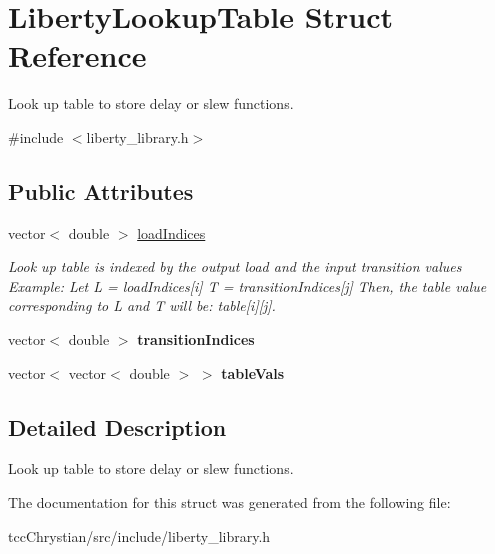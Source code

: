 \hypertarget{structLibertyLookupTable}{\section{Liberty\-Lookup\-Table Struct Reference}
\label{structLibertyLookupTable}
}


Look up table to store delay or slew functions.  




{\ttfamily \#include $<$liberty\-\_\-library.\-h$>$}

\subsection*{Public Attributes}
\begin{DoxyCompactItemize}
\item 
\hypertarget{structLibertyLookupTable_aa9185452db835be3f9c603c3f3df5562}{vector$<$ double $>$ \hyperlink{structLibertyLookupTable_aa9185452db835be3f9c603c3f3df5562}{load\-Indices}}\label{structLibertyLookupTable_aa9185452db835be3f9c603c3f3df5562}

\begin{DoxyCompactList}\small\item\em Look up table is indexed by the output load and the input transition values Example\-: Let L = load\-Indices\mbox{[}i\mbox{]} T = transition\-Indices\mbox{[}j\mbox{]} Then, the table value corresponding to L and T will be\-: table\mbox{[}i\mbox{]}\mbox{[}j\mbox{]}. \end{DoxyCompactList}\item 
\hypertarget{structLibertyLookupTable_a1f7a1d2e84535f8c7df9bac33732634d}{vector$<$ double $>$ {\bfseries transition\-Indices}}\label{structLibertyLookupTable_a1f7a1d2e84535f8c7df9bac33732634d}

\item 
\hypertarget{structLibertyLookupTable_a1ca823f563ac9e3e8a616b09a19da596}{vector$<$ vector$<$ double $>$ $>$ {\bfseries table\-Vals}}\label{structLibertyLookupTable_a1ca823f563ac9e3e8a616b09a19da596}

\end{DoxyCompactItemize}


\subsection{Detailed Description}
Look up table to store delay or slew functions. 

The documentation for this struct was generated from the following file\-:\begin{DoxyCompactItemize}
\item 
tcc\-Chrystian/src/include/liberty\-\_\-library.\-h\end{DoxyCompactItemize}
